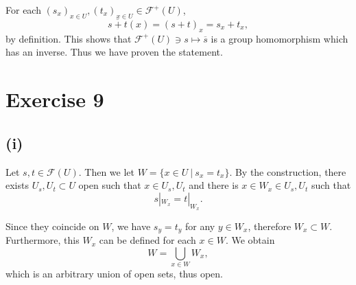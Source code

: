 \documentclass{article}
\begin{document}
\par For each $(s_x)_{x\in U},(t_x)_{x\in U}\in\mathcal{F}^+(U)$, 
\begin{equation*}
\overline{s+t}(x) = (s+t)_x = s_x+t_x, 
\end{equation*}
by definition. This shows that $\mathcal{F}^+(U)\ni s\mapsto \overline{s}$ is a group homomorphism which has an inverse. Thus we have proven the statement.

\section*{Exercise 9}

\subsection*{(i)}

Let $s,t\in\mathcal{F}(U)$. Then we let $W=\{x\in U\:|\: s_x=t_x\}$. By the construction, there exists $U_s,U_t\subset U$ open such that $x\in U_s,U_t$ and there is $x\in W_x\in U_s,U_t$ such that 
\begin{equation*}
s|_{W_x} = t|_{W_x}.
\end{equation*}

Since they coincide on $W$, we have $s_y=t_y$ for any $y\in W_x$, therefore $W_x\subset W$. Furthermore, this $W_x$ can be defined for each $x\in W$. We obtain
\begin{equation*}
W=\bigcup_{x\in W}W_x,
\end{equation*}
which is an arbitrary union of open sets, thus open.
\end{document}
